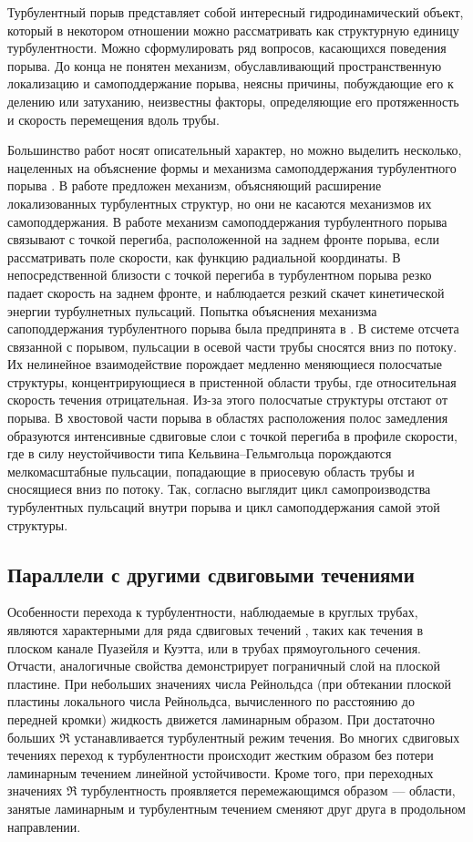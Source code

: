 Турбулентный порыв представляет собой интересный гидродинамический объект, который в некотором отношении можно рассматривать как структурную единицу турбулентности. Можно сформулировать ряд вопросов, касающихся поведения порыва. До конца не понятен механизм, обуславливающий пространственную локализацию и самоподдержание порыва, неясны причины, побуждающие его к делению или затуханию, неизвестны факторы, определяющие его протяженность и скорость перемещения вдоль трубы.

Большинство работ носят описательный характер, но можно выделить несколько, нацеленных на объяснение формы и механизма самоподдержания турбулентного порыва \cite{Duguet2010, Hof2010, Shimizu2009}. В работе \cite{Duguet2010} предложен механизм, объясняющий расширение локализованных турбулентных структур, но они не касаются механизмов их самоподдержания. В работе \cite{Hof2010} механизм самоподдержания турбулентного порыва связывают с точкой перегиба, расположенной на заднем фронте порыва, если рассматривать поле скорости, как функцию радиальной координаты. В непосредственной близости с точкой перегиба в турбулентном порыва резко падает скорость на заднем фронте, и наблюдается резкий скачет кинетической энергии турбулнетных пульсаций. 
Попытка объяснения механизма сапоподдержания турбулентного порыва была предпринята в \cite{Shimizu2009}. В системе отсчета связанной с порывом, пульсации в осевой части трубы сносятся вниз по потоку. Их нелинейное взаимодействие порождает медленно меняющиеся полосчатые структуры, концентрирующиеся в пристенной области трубы, где относительная скорость течения отрицательная. Из-за этого полосчатые структуры отстают от порыва. В хвостовой части порыва в областях расположения полос замедления образуются интенсивные сдвиговые слои с точкой перегиба в профиле скорости, где в силу неустойчивости типа Кельвина--Гельмгольца порождаются мелкомасштабные пульсации, попадающие в приосевую область трубы и сносящиеся вниз по потоку. Так, согласно \cite{Shimizu2009} выглядит цикл самопроизводства турбулентных пульсаций внутри порыва и цикл самоподдержания самой этой структуры.


	\subsection{Параллели с другими сдвиговыми течениями}

Особенности перехода к турбулентности, наблюдаемые в круглых трубах, являются характерными для ряда сдвиговых течений \cite{Manneville2015, Manneville2016}, таких как течения в плоском канале Пуазейля и Куэтта, или в трубах прямоугольного сечения. Отчасти, аналогичные свойства демонстрирует пограничный слой на плоской пластине. При небольших значениях числа Рейнольдса (при обтекании плоской пластины локального числа Рейнольдса, вычисленного по расстоянию до передней кромки) жидкость движется ламинарным образом. При достаточно больших $\Re$ устанавливается турбулентный режим течения. Во многих сдвиговых течениях переход к турбулентности происходит жестким образом без потери ламинарным течением линейной устойчивости. Кроме того, при переходных значениях $\Re$ турбулентность проявляется перемежающимся образом --- области, занятые ламинарным и турбулентным течением сменяют друг друга в продольном направлении.  

